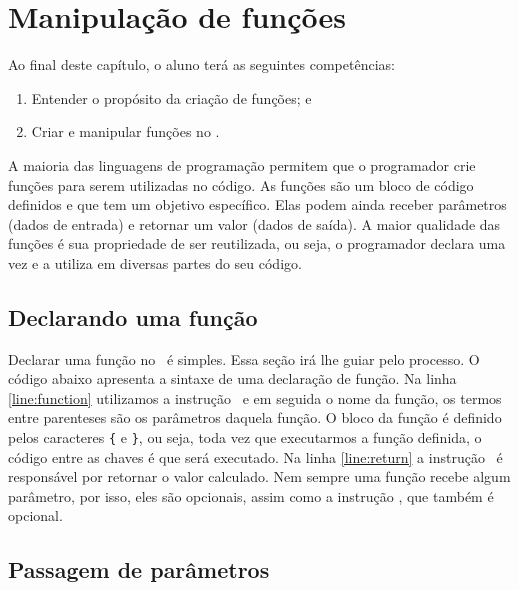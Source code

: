 \chapter{Manipulação de funções}
\label{manipulacao-de-funcoes}

Ao final deste capítulo, o aluno terá as seguintes competências:
\begin{enumerate}
    \item Entender o propósito da criação de funções; e
    \item Criar e manipular funções no \php.
\end{enumerate}

A maioria das linguagens de programação permitem que o programador crie 
funções para serem utilizadas no código. As funções são um bloco de código 
definidos e que tem um objetivo específico. Elas podem ainda receber 
parâmetros (dados de entrada) e retornar um valor (dados de saída). 
A maior qualidade das funções é sua propriedade de ser reutilizada, ou seja, 
o programador declara uma vez e a utiliza em diversas partes do seu código. 

\section{Declarando uma função}
\label{declarando-uma-funcao}

Declarar uma função no \php~é simples. Essa seção irá lhe guiar pelo processo. 
O código abaixo apresenta a sintaxe de uma declaração de função. Na linha \ref{line:function} 
utilizamos a instrução \comandofunction~e em seguida o nome da função, os termos 
entre parenteses são os parâmetros daquela função. O bloco da função é definido 
pelos caracteres \texttt{\{} e \texttt{\}}, ou seja, toda vez que executarmos a 
função definida, o código entre as chaves é que será executado. Na linha \ref{line:return} 
a instrução \comandoreturn~é responsável por retornar 
o valor calculado. Nem sempre uma função recebe algum parâmetro, por isso, 
eles são opcionais, assim como a instrução \comandoreturn, que também é opcional.



\section{Passagem de parâmetros}
\label{passagem-de-parametros}

